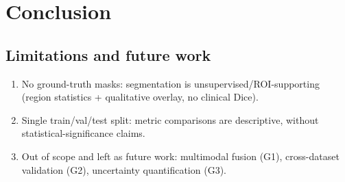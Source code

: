 \documentclass[a4paper,fleqn]{cas-sc}
\begin{document}
\section{Conclusion}\label{sec:conclusion}

\subsection*{Limitations and future work}\label{sec:limits}
\begin{enumerate}
\item No ground-truth masks: segmentation is unsupervised/ROI-supporting (region statistics + qualitative overlay, no clinical Dice).
\item Single train/val/test split: metric comparisons are descriptive, without statistical-significance claims.
\item Out of scope and left as future work: multimodal fusion (G1), cross-dataset validation (G2), uncertainty quantification (G3).
\end{enumerate}

\printcredits



\end{document}
